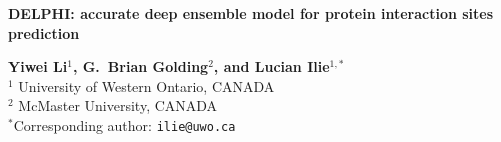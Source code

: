 \documentclass[a0,portrait]{a0poster}
\begin{document}


\noindent
{\veryHuge\color{NavyBlue} \textbf{DELPHI: accurate deep ensemble model for protein interaction sites prediction}}\\ %

\noindent
\begin{minipage}[m]{0.5\linewidth}
 \color{Black}
\huge \textbf{Yiwei Li$^1$, G.~Brian Golding$^2$, and Lucian Ilie$^{1,*}$}\\ %
\huge $^1$ University of Western Ontario, CANADA\\ %
\huge $^2$ McMaster University, CANADA\\ %
{\normalsize $^*$Corresponding author: \texttt{ilie@uwo.ca}}
\end{minipage}
%
\end{document}

